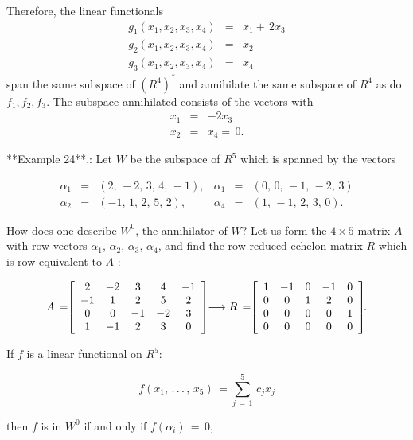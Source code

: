 Therefore, the linear functionals \[\begin{array}{rcl}g_{1}(x_{1},x_{2},x_{3},x_{4})&=&x_{1}+\,2x_{3}\\ g_{2}(x_{1},x_{2},x_{3},x_{4})&=&x_{2}\\ g_{3}(x_{1},x_{2},x_{3},x_{4})&=&x_{4}\end{array}\] span the same subspace of \((R^{4})^{*}\) and annihilate the same subspace of \(R^{4}\) as do \(f_{1},f_{2},f_{3}\). The subspace annihilated consists of the vectors with \[\begin{array}{rcl}x_{1}&=&-2x_{3}\\ x_{2}&=&x_{4}=\,0.\end{array}\]

**Example 24**.: Let \(W\) be the subspace of \(R^{5}\) which is spanned by the vectors

\[\begin{array}{rcl}\alpha_{1}&=&(2,\,-2,\,3,\,4,\,-1),&\alpha_{1}&=&(0,\,0,\, -1,\,-2,\,3)\\ \alpha_{2}&=&(-1,\,1,\,2,\,5,\,2),&\alpha_{4}&=&(1,\,-1,\,2,\,3,\,0).\end{array}\]

How does one describe \(W^{0}\), the annihilator of \(W\)? Let us form the \(4\times 5\) matrix \(A\) with row vectors \(\alpha_{1}\), \(\alpha_{2}\), \(\alpha_{3}\), \(\alpha_{4}\), and find the row-reduced echelon matrix \(R\) which is row-equivalent to \(A\) :

\[A\,=\!\!\left[\begin{array}{ccccc}2&-2&3&4&-1\\ -1&1&2&5&2\\ 0&0&-1&-2&3\\ 1&-1&2&3&0\end{array}\right]\!\!\longrightarrow R\,=\!\!\left[\begin{array}[] {ccccc}1&-1&0&-1&0\\ 0&0&1&2&0\\ 0&0&0&0&1\\ 0&0&0&0&0\end{array}\right]\!\!.\]

If \(f\) is a linear functional on \(R^{5}\):

\[f(x_{1},\,.\,.\,.\,,\,x_{5})\,=\!\!\sum\limits_{j\,=\,1}^{5}\,c_{j}x_{j}\]

then \(f\) is in \(W^{0}\) if and only if \(f(\alpha_{i})\,=\,0\), \ 